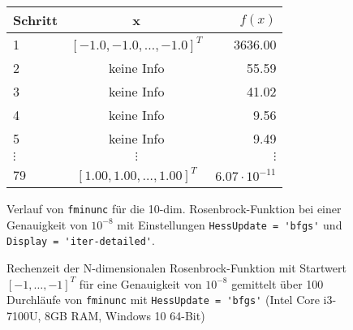 \documentclass[a4paper, 12pt]{report}
\begin{document}
\begin{figure}[H]
  \centering
  \def\arraystretch{1.25}
  \begin{tabular}{l|c|r}
    \hline
    \textbf{Schritt} & \textbf{x} & \textbf{$f(x)$}\\
    \hline
    1 & $[-1.0, -1.0, \ldots, -1.0]^T$ & 3636.00\\
    2 & keine Info & 55.59\\
    3 & keine Info & 41.02\\
    4 & keine Info & 9.56\\
    5 & keine Info & 9.49\\
    $\vdots$ & $\vdots$ & $\vdots$\\
    79 & $[1.00, 1.00, \ldots, 1.00]^T$ & $6.07\cdot 10^{-11}$\\
    \hline
  \end{tabular}
  \caption{Verlauf von \lstinline[basicstyle=\ttfamily\color{black}]|fminunc| für die 10-dim. Rosenbrock-Funktion bei einer Genauigkeit von
          $10^{-8}$ mit Einstellungen \lstinline[basicstyle=\ttfamily\color{black}]|HessUpdate = 'bfgs'| und
          \lstinline[basicstyle=\ttfamily\color{black}]|Display = 'iter-detailed'|.}
\end{figure}

\begin{figure}[H]
  \centering
\caption{Rechenzeit der N-dimensionalen Rosenbrock-Funktion mit Startwert $[-1, \ldots, -1]^T$ für
  eine Genauigkeit von $10^{-8}$ gemittelt über 100 Durchläufe von \lstinline[basicstyle=\ttfamily\color{black}]|fminunc| mit
  \lstinline[basicstyle=\ttfamily\color{black}]|HessUpdate = 'bfgs'| (Intel Core i3-7100U, 8GB RAM, Windows 10 64-Bit)}
\end{figure}
\end{document}
